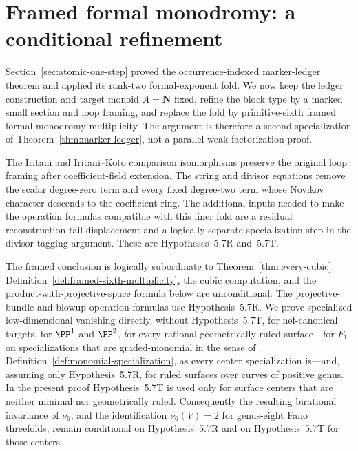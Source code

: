 \section{Framed formal monodromy: a conditional refinement}
\label{sec:framed-monodromy}

Section~\ref{sec:atomic-one-step} proved the occurrence-indexed marker-ledger
theorem and applied its rank-two formal-exponent fold.  We now keep the ledger
construction and target monoid \(A=\mathbf N\) fixed, refine the block type by
a marked small section and loop framing, and replace the fold by
primitive-sixth framed formal-monodromy multiplicity.  The argument is
therefore a second specialization of Theorem~\ref{thm:marker-ledger}, not a
parallel weak-factorization proof.

The Iritani and Iritani--Koto comparison isomorphisms preserve the original
loop framing after coefficient-field extension.  The string and divisor
equations remove the scalar degree-zero term and every fixed degree-two term
whose Novikov character descends to the coefficient ring.  The additional
inputs needed to make the operation formulas compatible with this finer fold
are a residual reconstruction-tail displacement and a logically separate
specialization step in the divisor-tagging argument.  These are
Hypotheses~5.7R and~5.7T.

The framed conclusion is logically subordinate to
Theorem~\ref{thm:every-cubic}.  Definition~\ref{def:framed-sixth-multiplicity},
the cubic computation, and the product-with-projective-space formula below
are unconditional.  The projective-bundle and blowup operation formulas
use Hypothesis~5.7R.  We prove specialized low-dimensional vanishing
directly, without Hypothesis~5.7T, for nef-canonical targets, for
\(\PP^1\) and \(\PP^2\), for every rational geometrically ruled surface---for
\(F_1\) on specializations that are graded-monomial in the sense of
Definition~\ref{def:monomial-specialization}, as every center specialization
is---and, assuming only Hypothesis~5.7R, for ruled surfaces over curves of
positive genus.  In the present proof Hypothesis~5.7T is used only
for surface centers that are neither minimal nor geometrically ruled.
Consequently the resulting birational invariance
of \(\nu_6\), and the identification \(\nu_6(V)=2\) for genus-eight Fano
threefolds, remain conditional on Hypothesis~5.7R and on Hypothesis~5.7T for
those centers.


